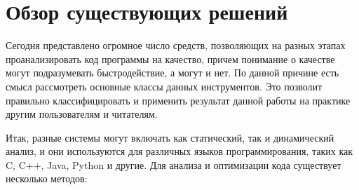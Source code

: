 \documentclass{mipt-thesis-bs}
\begin{document}
\chapter{Обзор существующих решений}
Сегодня представлено огромное число средств, позволяющих на разных этапах проанализировать код программы на качество,
причем понимание о качестве могут подразумевать быстродействие, а могут и нет. По данной причине есть смысл
рассмотреть основные классы данных инструментов. Это позволит правильно классифицировать и применить результат данной
работы на практике другим пользователям и читателям.

Итак, разные системы могут включать как статический, так и динамический анализ, и они
используются для различных языков программирования, таких как C, C++, Java, Python и другие.
Для анализа и оптимизации кода существует несколько методов:
\end{document}
